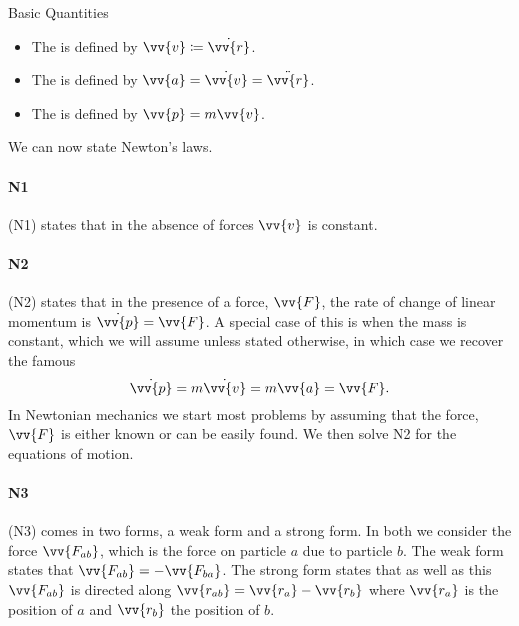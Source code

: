 \documentclass[fleqn]{NotesClass}
\begin{document}
    \begin{dfn}{Basic Quantities}{}
        \begin{itemize}
            \item The  is defined by \(\vv{v} \coloneqq \dot{\vv{r}}\).
            \item The  is defined by \(\vv{a} = \dot{\vv{v}} = \ddot{\vv{r}}\).
            \item The  is defined by \(\vv{p} = m\vv{v}\).
        \end{itemize}
    \end{dfn}
    
    We can now state Newton's laws.
    \paragraph{N1}  (N1) states that in the absence of forces \(\vv{v}\) is constant.
    \paragraph{N2}  (N2) states that in the presence of a force, \(\vv{F}\), the rate of change of linear momentum is \(\dot{\vv{p}} = \vv{F}\).
    A special case of this is when the mass is constant, which we will assume unless stated otherwise, in which case we recover the famous
    \begin{equation}
        \dot{\vv{p}} = m\dot{\vv{v}} = m\vv{a} = \vv{F}.
    \end{equation}
    In Newtonian mechanics we start most problems by assuming that the force, \(\vv{F}\) is either known or can be easily found.
    We then solve N2 for the equations of motion.
    \paragraph{N3}  (N3) comes in two forms, a weak form and a strong form.
    In both we consider the force \(\vv{F_{ab}}\), which is the force on particle \(a\) due to particle \(b\).
    The weak form states that \(\vv{F_{ab}} = -\vv{F_{ba}}\).
    The strong form states that as well as this \(\vv{F_{ab}}\) is directed along \(\vv{r_{ab}} = \vv{r_a} - \vv{r_b}\) where \(\vv{r_a}\) is the position of \(a\) and \(\vv{r_b}\) the position of \(b\).
    
\end{document}
